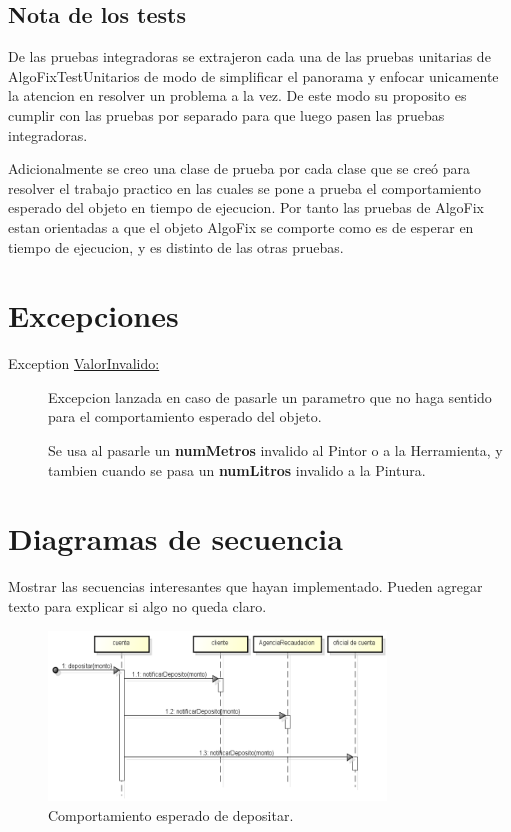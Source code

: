 \documentclass[titlepage,a4paper]{article}
\begin{document}
\subsection{Nota de los tests}
De las pruebas integradoras se extrajeron cada una de las pruebas unitarias de 
\newline AlgoFixTestUnitarios de modo de simplificar el panorama y enfocar 
unicamente la atencion en resolver un problema a la vez. 
De este modo su proposito es cumplir con las pruebas por separado para que luego 
pasen las pruebas integradoras. \newline

Adicionalmente se creo una clase de prueba por cada clase que se creó para resolver el trabajo practico
en las cuales se pone a prueba el comportamiento esperado del objeto en tiempo de ejecucion. Por tanto
las pruebas de AlgoFix estan orientadas a que el objeto AlgoFix se comporte como es de esperar en tiempo de ejecucion, 
y es distinto de las otras pruebas.


\section{Excepciones}\label{sec:excepciones}
\begin{description}
\item[Exception \underline{ValorInvalido:}] Excepcion lanzada en caso de pasarle un parametro que no haga sentido para el comportamiento esperado del objeto.

Se usa al pasarle un \textbf{numMetros} invalido al Pintor o a la Herramienta, y tambien cuando se pasa un \textbf{numLitros} invalido a la Pintura.
\end{description}


\section{Diagramas de secuencia}\label{sec:diagramasdesecuencia}
Mostrar las secuencias interesantes que hayan implementado. Pueden agregar texto para explicar si algo no queda claro. 

\begin{figure}[H]
\centering
\includegraphics[width=0.8\textwidth]{diagrama_secuencia01.png}   %
\caption{\label{fig:seq01}Comportamiento esperado de depositar.}
\end{figure}
\end{document}
